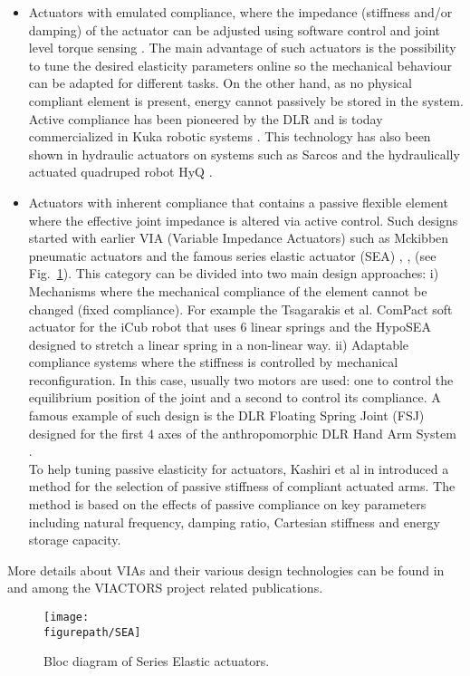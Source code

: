 \begin{itemize}
\item Actuators with emulated compliance, where the impedance (stiffness and/or damping) of the actuator can be adjusted using software control and joint level torque sensing \cite{loughlin2007dlr}. The main advantage of such actuators is the possibility to tune the desired elasticity parameters online so the mechanical behaviour can be adapted for different tasks. On the other hand, as no physical compliant element is present, energy cannot passively be stored in the system. Active compliance has been pioneered by the DLR and is today commercialized in Kuka robotic systems \cite{bischoff2010kuka}. This technology has also been shown in hydraulic actuators on systems such as Sarcos \cite{hyon2007full} and the hydraulically actuated quadruped robot HyQ \cite{boaventura2012dynamic}.
\item Actuators with inherent compliance that contains a passive flexible element where the effective joint impedance is altered via active control. Such designs started with earlier VIA (Variable Impedance Actuators) such as Mckibben pneumatic actuators \cite{caldwell1995control} and the famous series elastic actuator (SEA) \cite{pratt1995series}, \cite{laffranchi2011compact}, \cite{vanderborght2013variable} (see Fig.~\ref{fig:SEA}). This category can be divided into two main design approaches: i) Mechanisms where the mechanical compliance of the element cannot be changed (fixed compliance). For example the Tsagarakis et al. \cite{tsagarakis2009compact} ComPact soft actuator for the iCub robot that uses 6 linear springs and the HypoSEA \cite{ivar2011nonlinear} designed to stretch a linear spring in a non-linear way. ii) Adaptable compliance systems where the stiffness is controlled by mechanical reconfiguration. In this case, usually two motors are used: one to control the equilibrium position of the joint and a second to control its compliance. A famous example of such design is the DLR
Floating Spring Joint (FSJ) \cite{wolf2011dlr} designed for the first 4 axes of the anthropomorphic DLR Hand Arm System \cite{grebenstein2011dlr}. \\
To help tuning passive elasticity for actuators, Kashiri et al in \cite{kashiri2013stiffness} introduced a method for the selection of passive stiffness of compliant actuated arms. The method is based on the effects of passive compliance on key parameters including natural frequency, damping ratio, Cartesian stiffness and energy storage capacity.
\end{itemize}
More details about VIAs and their various design technologies can be found in \cite{vanderborght2013variable} and among the VIACTORS project \cite{VIACTORS-url} related publications. 
\begin{figure}[!ht]
\centering
\texttt{[image: \\figurepath/SEA]}
\caption{Bloc diagram of Series Elastic actuators.}
\label{fig:SEA}
\end{figure} 
